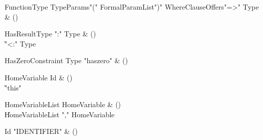 \begin{bbgrammar}

FunctionType \label{prod:FunctionType}  \: TypeParams\opt \xcd"(" FormalParamList\opt \xcd")" WhereClause\opt Offers\opt \xcd"=>" Type & () \\


\end{bbgrammar}

\begin{bbgrammar}

HasResultType \label{prod:HasResultType}  \: \xcd":" Type & () \\

    \| \xcd"<:" Type \\

\end{bbgrammar}

\begin{bbgrammar}

HasZeroConstraint \label{prod:HasZeroConstraint}  \: Type  \xcd"haszero" & () \\


\end{bbgrammar}

\begin{bbgrammar}

HomeVariable \label{prod:HomeVariable}  \: Id & () \\

    \| \xcd"this" \\

\end{bbgrammar}

\begin{bbgrammar}

HomeVariableList \label{prod:HomeVariableList}  \: HomeVariable & () \\

    \| HomeVariableList \xcd"," HomeVariable \\

\end{bbgrammar}

\begin{bbgrammar}

Id \label{prod:Id}  \: \xcd"IDENTIFIER"  & () \\


\end{bbgrammar}

